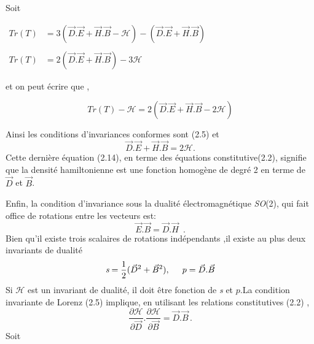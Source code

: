 \documentclass[12pt,a4paper, openany]{report}
\begin{document}
	Soit \\
	\begin{center}
		$\left.\begin{aligned}
			Tr(T)&=3(\vec{D}.\vec{E}+\vec{H}.\vec{B}-\mathcal{H})-(\vec{D}.\vec{E}+\vec{H}.\vec{B})\\
			\\
			Tr(T)&=2(\vec{D}.\vec{E}+\vec{H}.\vec{B})-3\mathcal{H}
		\end{aligned}\right.$\\
	\end{center} 
	et on peut écrire que ,
	\begin{center}
		\begin{equation}
			Tr(T)-\mathcal{H}=2(\vec{D}.\vec{E}+\vec{H}.\vec{B}-2\mathcal{H})	
		\end{equation}
	\end{center}
	Ainsi les conditions d'invariances conformes sont (2.5) et 
	\begin{equation}
		\vec{D}.\vec{E}+\vec{H}.\vec{B}=2\mathcal{H}.
	\end{equation}
	Cette dernière équation (2.14), en terme des équations constitutive(2.2), signifie que la densité hamiltonienne est une fonction homogène de degré 2 en terme de $\vec{D}$ et $\vec{B}$.\par Enfin, la condition d'invariance sous la dualité électromagnétique \textit{SO}(2), qui fait office de rotations entre les  vecteurs est:
	\begin{equation}
		\vec{E}.\vec{B}=\vec{D}.\vec{H} \,\,\,.
	\end{equation}
	Bien qu'il existe trois scalaires de rotations indépendants ,il existe au plus deux invariants de dualité 
	\begin{equation}
		\textit{s}=\frac{1}{2}(\vec{D}^2+\vec{B}^2) ,\hspace{0.5cm} p=\vec{D}.\vec{B}
	\end{equation} 
	Si $\mathcal{H}$ est un invariant de dualité, il doit \^{e}tre fonction de \textit{s} et $p$.La condition invariante de Lorenz (2.5) implique, en utilisant les relations constitutives (2.2) , 
	\begin{equation}
		\frac{\partial{\mathcal{H}}}{\partial{\vec{D}}}.\frac{\partial{\mathcal{H}}}{\partial{\vec{B}}}=\vec{D}.\vec{B} \,.
	\end{equation}
	Soit \\
	
\end{document}
